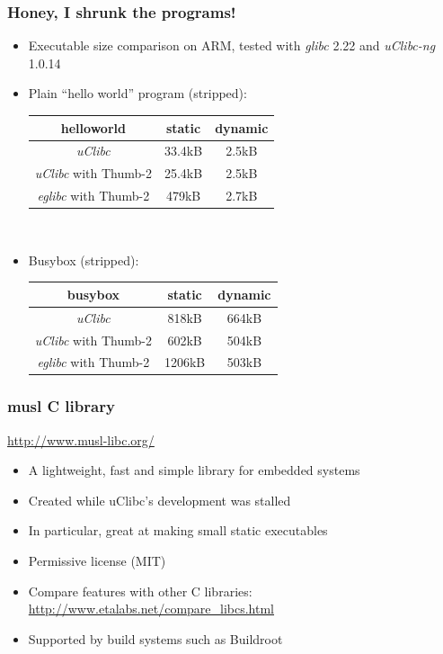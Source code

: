 \begin{frame}
  \frametitle{Honey, I shrunk the programs!}
  \begin{itemize}
  \item Executable size comparison on ARM, tested with {\em glibc}
  2.22 and {\em uClibc-ng} 1.0.14
  \item Plain ``hello world'' program (stripped): \\
    \begin{tabular}{| c || c | c |} \hline
    helloworld & static & dynamic \\ \hline
    {\em uClibc} & 33.4kB & 2.5kB \\
    {\em uClibc} with Thumb-2 & 25.4kB & 2.5kB \\
    {\em eglibc} with Thumb-2 & 479kB & 2.7kB \\ \hline
    \end{tabular} \\
  \item Busybox (stripped): \\
    \begin{tabular}{| c || c | c |} \hline
    busybox & static & dynamic \\ \hline
    {\em uClibc} & 818kB & 664kB \\
    {\em uClibc} with Thumb-2 & 602kB & 504kB \\
    {\em eglibc} with Thumb-2 & 1206kB & 503kB \\ \hline
    \end{tabular}
  \end{itemize}
\end{frame}

\begin{frame}
  \frametitle{musl C library}
  \url{http://www.musl-libc.org/}
  \begin{itemize}
  \item A lightweight, fast and simple library for embedded systems
  \item Created while uClibc's development was stalled
  \item In particular, great at making small static executables
  \item Permissive license (MIT)
  \item Compare features with other C libraries:
    \url{http://www.etalabs.net/compare_libcs.html}
  \item Supported by build systems such as Buildroot
  \end{itemize}
\end{frame}

